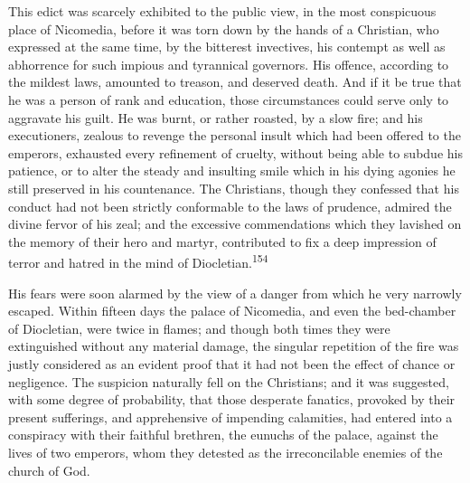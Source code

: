 


This edict was scarcely exhibited to the public view, in the most
conspicuous place of Nicomedia, before it was torn down by the
hands of a Christian, who expressed at the same time, by the
bitterest invectives, his contempt as well as abhorrence for such
impious and tyrannical governors. His offence, according to the
mildest laws, amounted to treason, and deserved death. And if it
be true that he was a person of rank and education, those
circumstances could serve only to aggravate his guilt. He was
burnt, or rather roasted, by a slow fire; and his executioners,
zealous to revenge the personal insult which had been offered to
the emperors, exhausted every refinement of cruelty, without
being able to subdue his patience, or to alter the steady and
insulting smile which in his dying agonies he still preserved in
his countenance. The Christians, though they confessed that his
conduct had not been strictly conformable to the laws of
prudence, admired the divine fervor of his zeal; and the
excessive commendations which they lavished on the memory of
their hero and martyr, contributed to fix a deep impression of
terror and hatred in the mind of Diocletian.\textsuperscript{154}


His fears were soon alarmed by the view of a danger from which he
very narrowly escaped. Within fifteen days the palace of
Nicomedia, and even the bed-chamber of Diocletian, were twice in
flames; and though both times they were extinguished without any
material damage, the singular repetition of the fire was justly
considered as an evident proof that it had not been the effect of
chance or negligence. The suspicion naturally fell on the
Christians; and it was suggested, with some degree of
probability, that those desperate fanatics, provoked by their
present sufferings, and apprehensive of impending calamities, had
entered into a conspiracy with their faithful brethren, the
eunuchs of the palace, against the lives of two emperors, whom
they detested as the irreconcilable enemies of the church of God.

